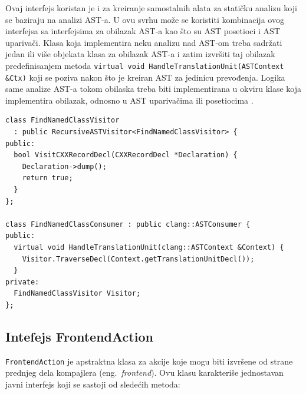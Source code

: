 \documentclass[12pt,oneside]{memoir}
\begin{document}
Ovaj interfejs koristan je i za kreiranje samostalnih alata za stati\v{c}ku analizu koji se baziraju na analizi AST-a. U ovu svrhu mo\v{z}e se koristiti kombinacija
ovog interfejsa sa interfejsima za obilazak AST-a kao \v{s}to su AST posetioci i AST upariva\v{c}i. Klasa koja implementira neku analizu nad AST-om treba sadr\v{z}ati jedan ili vi\v{s}e objekata klasa za obilazak AST-a i zatim izvr\v{s}iti taj obilazak predefinisanjem metoda \texttt{virtual void  HandleTranslationUnit(ASTContext \&Ctx)} koji se poziva nakon \v{s}to je kreiran AST za jedinicu prevođenja. Logika same analize AST-a tokom obilaska treba biti implementirana u okviru klase koja implementira obilazak, odnosno u AST upariva\v{c}ima ili posetiocima \cite{ASTConsumer}.

\begin{lstlisting}[style=customc, caption={Primer upotrebe klase \textit{ASTConsumer} \cite{ASTToolTutorial}}, label=lst:label7, captionpos=b]
class FindNamedClassVisitor
  : public RecursiveASTVisitor<FindNamedClassVisitor> {
public:
  bool VisitCXXRecordDecl(CXXRecordDecl *Declaration) {
    Declaration->dump();
    return true;
  }
};

class FindNamedClassConsumer : public clang::ASTConsumer {
public:
  virtual void HandleTranslationUnit(clang::ASTContext &Context) {
    Visitor.TraverseDecl(Context.getTranslationUnitDecl());
  }
private:
  FindNamedClassVisitor Visitor;
};
\end{lstlisting}

\subsection{Intefejs FrontendAction}

\texttt{FrontendAction} je apstraktna klasa za akcije koje mogu biti izvr\v{s}ene od strane prednjeg dela kompajlera (eng.~\textit{frontend}).
Ovu klasu karakteri\v{s}e jednostavan javni interfejs koji se sastoji od slede\'{c}ih metoda:
\end{document}
